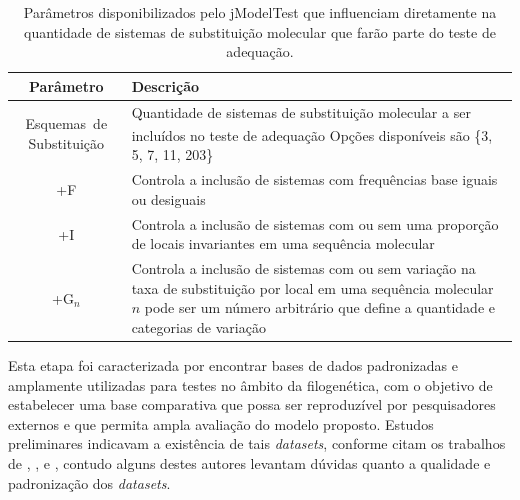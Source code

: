 \documentclass[english,brazilian]{UNISINOSmonografia} %
\newcommand\defaultFigureWidth{0.9}
\renewcommand{\arraystretch}{1.3}
\begin{document}
\begin{table}[tb]
	\centering%
	\begin{minipage}{\defaultFigureWidth\textwidth}
		\caption{Parâmetros disponibilizados pelo jModelTest que influenciam diretamente na quantidade de sistemas de substituição molecular que farão parte do teste de adequação.}
		\label{tab:metodologia-etapas-jmodelparams}
		\small
		\vspace{1ex}
		\renewcommand\arraystretch{1.4}
		\setlength{\tymin}{9em}
		\begin{tabulary}{\textwidth}{CJ@{}}
			\toprule
			Parâmetro & Descrição \\ 
			\midrule
			Esquemas~de Substituição & Quantidade de sistemas de substituição molecular a ser incluídos no teste de adequação\textsuperscript{\dag} \newline 
			Opções disponíveis são \{3, 5, 7, 11, 203\} \\
			+F & Controla a inclusão de sistemas com frequências base iguais ou desiguais \\
			+I & Controla a inclusão de sistemas com ou sem uma proporção de locais invariantes em uma sequência molecular \\
			+G$_{n}$ & Controla a inclusão de sistemas com ou sem variação na taxa de substituição por local em uma sequência molecular \newline
			$n$ pode ser um número arbitrário que define a quantidade e categorias de variação \\
			\bottomrule	
		\end{tabulary}
	\end{minipage}
\end{table}


Esta etapa foi caracterizada por encontrar bases de dados padronizadas e amplamente utilizadas para testes no âmbito da filogenética, com o objetivo de estabelecer uma base comparativa que possa ser reproduzível por pesquisadores externos e que permita ampla avaliação do modelo proposto.
Estudos preliminares indicavam a existência de tais \textit{datasets}, conforme citam os trabalhos de , ,  e , contudo alguns destes autores levantam dúvidas quanto a qualidade e padronização dos \textit{datasets}.
\end{document}

